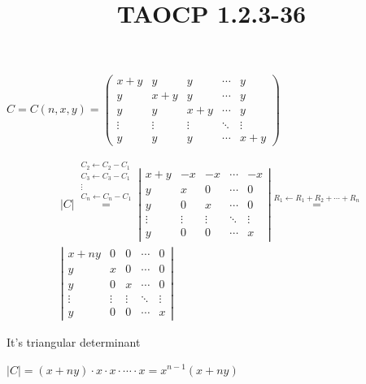 \documentclass{article}
\title{TAOCP 1.2.3\mbox{-}36}
\begin{document}
\maketitle

\( C = C(n,x,y) = \left(\begin{matrix}x + y & y & y & \cdots & y \\ y & x + y & y & \cdots & y \\ y & y & x + y & \cdots & y \\ \vdots & \vdots & \vdots & \ddots & \vdots \\ y & y & y & \cdots & x + y \end{matrix}\right) \)

\begin{multline*}
|C| \overset{\substack{C_{2} \leftarrow C_{2} - C_{1} \\ C_{3} \leftarrow C_{3} - C_{1} \\ \vdots \\ C_{n} \leftarrow C_{n} - C_{1}}}{=}  \left|\begin{matrix}x + y & -x & -x & \cdots & -x \\ y & x & 0 & \cdots & 0 \\ y & 0 & x & \cdots & 0\\ \vdots & \vdots & \vdots & \ddots & \vdots \\ y & 0 & 0 & \cdots & x \end{matrix}\right| \overset{R_{1} \leftarrow R_{1} + R_{2} + \cdots + R_{n}}{=} \\
\left|\begin{matrix}x + ny & 0 & 0 & \cdots & 0 \\ y & x & 0 & \cdots & 0 \\ y & 0 & x & \cdots & 0\\ \vdots & \vdots & \vdots & \ddots & \vdots \\ y & 0 & 0 & \cdots & x \end{matrix}\right|
\end{multline*}

It's triangular determinant

\( |C| = (x+ny)\cdot x \cdot x \cdot \cdots \cdot x = x^{n-1}(x+ny) \)
\end{document}
